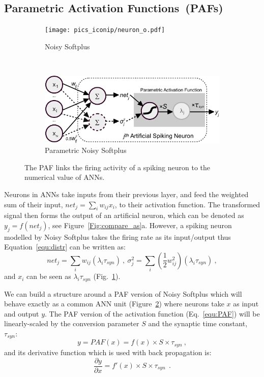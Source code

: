 \documentclass{article}
\begin{document}
\subsection{Parametric Activation Functions~(PAFs)}
\begin{figure}[tbh!]
	\centering
	\begin{subfigure}[t]{0.49\textwidth}
		\texttt{[image: pics\_iconip/neuron\_o.pdf]}
		\caption{Noisy Softplus}
    \label{fig:noisy-softplus-neuron}
	\end{subfigure}~~~
	\begin{subfigure}[t]{0.42\textwidth}
		\includegraphics[width=\textwidth]{pics_iconip/neuron_PAF.pdf}
		\caption{Parametric Noisy Softplus}
    \label{fig:parametric-noisy-softplus-neuron}
	\end{subfigure}
	\caption{The PAF links the firing activity of a spiking neuron to the numerical value of ANNs.}
	\label{Fig:tneuron}
\end{figure}


Neurons in ANNs take inputs from their previous layer, and feed the weighted sum of their input, $net_j = \sum_i w_{ij}x_i$, to their activation function.
The transformed signal then forms the output of an artificial neuron, which can be denoted as $y_j=f(net_j)$, see Figure~\ref{Fig:compare_as}a.
However, a spiking neuron modelled by Noisy Softplus takes the firing rate as its input/output thus Equation~\ref{equ:distr} can be written as:
\begin{equation}
net_j = \sum_i w_{ij}(\lambda_{i}\tau_{syn})~,
~\sigma^2_j= \sum_i (\frac{1}{2} w_{ij}^2)(\lambda_{i}\tau_{syn})~, 
\label{equ:mi_input}
\end{equation}
and $x_{i}$ can be seen as $\lambda_{i}\tau_{syn}$ (Fig.~\ref{fig:noisy-softplus-neuron}).

We can build a structure around a PAF version of Noisy Softplus which will behave exactly as a common ANN unit (Figure~\ref{fig:parametric-noisy-softplus-neuron}) where neurons take $x$ as input and output $y$.
The PAF version of the activation function (Eq.~\ref{equ:PAF}) will be linearly-scaled by the conversion parameter $S$ and the synaptic time constant, $\tau_{syn}$:
\begin{equation}
y = PAF(x) = f(x) \times S \times \tau_{syn}~,
\label{equ:PAF}
\end{equation}
and its derivative function which is used with back propagation is:
\begin{equation}
\frac{\partial y}{\partial x} = f'(x) \times S \times \tau_{syn}~~.
\end{equation}
\end{document}
